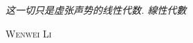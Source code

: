 
\vspace*{\fill}

\Large\textit{这一切只是虚张声势的线性代数. 線性代數}

\bigskip

\begin{flushright}
    \sffamily\scshape Wenwei Li
\end{flushright}

\normalfont\normalsize

\vspace*{\fill}
